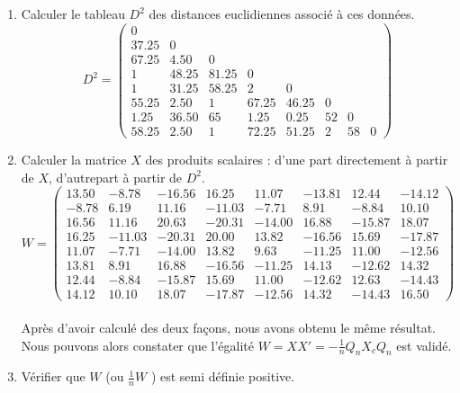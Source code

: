 \documentclass[a4paper,11pt]{article}
\begin{document}
\begin{enumerate}
  \item Calculer le tableau $D^2$ des distances euclidiennes associé à ces données.
    \[D^2 = \begin{pmatrix}
    0 \\
    37.25 & 0 \\
    67.25 & 4.50 & 0 \\
    1 & 48.25 & 81.25 & 0 \\
    1 & 31.25 & 58.25 & 2 & 0 \\
    55.25 & 2.50 & 1 & 67.25 & 46.25 & 0 \\
    1.25 & 36.50 & 65 & 1.25 & 0.25 & 52 & 0 \\
    58.25 & 2.50 & 1 & 72.25 & 51.25 & 2 & 58 & 0
    \end{pmatrix}\]
    
  \item Calculer la matrice $X$ des produits scalaires : d’une part directement à partir de $X$, d’autrepart à partir de $D^2$.
    \[W =\begin{pmatrix}
    13.50 & -8.78 & -16.56 & 16.25 & 11.07 & -13.81 & 12.44 & -14.12\\
    -8.78 &  6.19 & 11.16 & -11.03 & -7.71 &  8.91 & -8.84 & 10.10\\
    16.56 & 11.16 & 20.63 & -20.31 & -14.00 & 16.88 & -15.87 & 18.07\\
    16.25 & -11.03 & -20.31 & 20.00 & 13.82 & -16.56 & 15.69 & -17.87\\
    11.07 & -7.71 & -14.00 & 13.82 &  9.63 & -11.25 & 11.00 & -12.56\\
    13.81 &  8.91 & 16.88 & -16.56 & -11.25 & 14.13 & -12.62 & 14.32\\
    12.44 & -8.84 & -15.87 & 15.69 & 11.00 & -12.62 & 12.63 & -14.43\\
    14.12 & 10.10 & 18.07 & -17.87 & -12.56 & 14.32 & -14.43 & 16.50
    \end{pmatrix}\]\\
    Après d'avoir calculé des deux façons, nous avons obtenu le même résultat. Nous pouvons alors constater que l'égalité $W = XX'= -\frac{1}{n}Q_{n}X_{c}Q_{n}$ est validé.\\
    \item Vérifier que $W$ (ou $\frac{1}{n}W$ ) est semi définie positive.
\end{enumerate}




\end{document}
